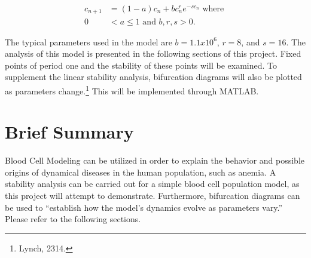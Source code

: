 	\begin{align*}
		c_{n+1} &= (1-a)c_{n} + bc_{n}^{r}e^{-sc_{n}} \text{ where } \\
		0 &<  a \le 1 \text{ and } b, r, s > 0.
	\end{align*}

	The typical parameters used in the model are $b = 1.1 x 10^{6}$, $r = 8$, and $s = 16$. The analysis of this model is presented in the following sections of this project. Fixed points of period one and the stability of these points will be examined. To supplement the linear stability analysis, bifurcation diagrams will also be plotted as parameters change.\footnote{Lynch, 2314.} This will be implemented through MATLAB.

\section*{Brief Summary}
	Blood Cell Modeling can be utilized in order to explain the behavior and possible origins of dynamical diseases in the human population, such as anemia. A stability analysis can be carried out for a simple blood cell population model, as this project will attempt to demonstrate. Furthermore, bifurcation diagrams can be used to ``establish how the model’s dynamics evolve as parameters vary.'' Please refer to the following sections. 
